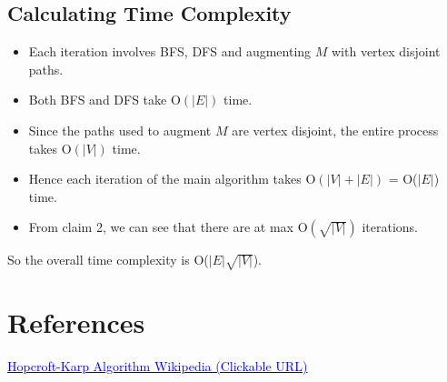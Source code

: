 \documentclass{article}
\begin{document}
\subsection{Calculating Time Complexity}
\begin{itemize}
    \item Each iteration involves BFS, DFS and augmenting $M$ with vertex disjoint paths.
    \item Both BFS and DFS take O$(|E|)$ time.
    \item Since the paths used to augment $M$ are vertex disjoint, the entire process takes O$(|V|)$ time.
    \item Hence each iteration of the main algorithm takes O$(|V|+|E|)$ = O($|E|$) time.
    \item From claim 2, we can see that there are at max O$(\sqrt{|V|})$ iterations.
\end{itemize}
So the overall time complexity is O($|E|\sqrt{|V|}$).

\section{References}
\href{https://en.wikipedia.org/wiki/Hopcroft\%E2\%80\%93Karp_algorithm}{\textcolor{blue}{Hopcroft-Karp Algorithm Wikipedia (Clickable URL)}}
\end{document}
